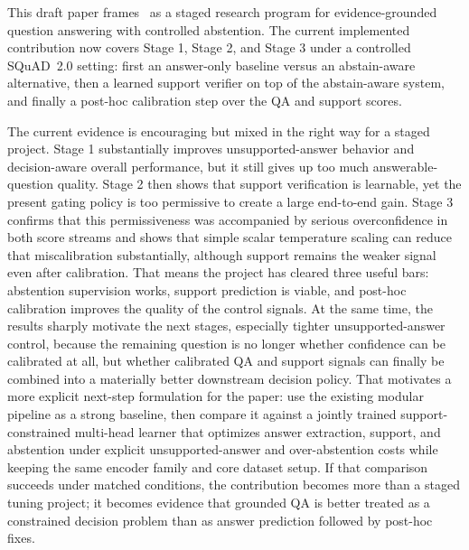 This draft paper frames \system\ as a staged research program for
evidence-grounded question answering with controlled abstention.
The current implemented contribution now covers Stage 1, Stage 2, and Stage 3
under a controlled SQuAD~2.0 setting:
first an answer-only baseline versus an abstain-aware alternative, then a
learned support verifier on top of the abstain-aware system, and finally a
post-hoc calibration step over the QA and support scores.

The current evidence is encouraging but mixed in the right way for a staged
project.
Stage 1 substantially improves unsupported-answer behavior and decision-aware
overall performance, but it still gives up too much answerable-question
quality.
Stage 2 then shows that support verification is learnable, yet the present
gating policy is too permissive to create a large end-to-end gain.
Stage 3 confirms that this permissiveness was accompanied by serious
overconfidence in both score streams and shows that simple scalar temperature
scaling can reduce that miscalibration substantially, although support remains
the weaker signal even after calibration.
That means the project has cleared three useful bars:
abstention supervision works, support prediction is viable, and post-hoc
calibration improves the quality of the control signals.
At the same time, the results sharply motivate the next stages, especially
tighter unsupported-answer control, because the remaining question is no longer
whether confidence can be calibrated at all, but whether calibrated QA and
support signals can finally be combined into a materially better downstream
decision policy.
That motivates a more explicit next-step formulation for the paper:
use the existing modular pipeline as a strong baseline, then compare it against
a jointly trained support-constrained multi-head learner that optimizes answer
extraction, support, and abstention under explicit unsupported-answer and
over-abstention costs while keeping the same encoder family and core dataset
setup.
If that comparison succeeds under matched conditions, the contribution becomes
more than a staged tuning project;
it becomes evidence that grounded QA is better treated as a constrained
decision problem than as answer prediction followed by post-hoc fixes.
